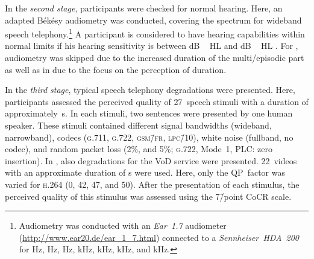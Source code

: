 In the \emph{second stage}, participants were checked for normal hearing.
Here, an adapted Békésy audiometry was conducted, covering the spectrum for wideband speech telephony.\footnote{Audiometry was conducted with an \emph{Ear~1.7} audiometer (\url{http://www.ear20.de/ear_1_7.html}) connected to a \emph{Sennheiser~HDA~200} for \unit[125]{Hz}, \unit[250]{Hz}, \unit[500]{Hz}, \unit[1]{kHz}, \unit[2]{kHz}, \unit[4]{kHz}, and \unit[8]{kHz}.}
A participant is considered to have hearing capabilities within normal limits if his hearing sensitivity is between \unit[0]{dB\,HL} and \unit[25]{dB\,HL} \citep[][p.\,256]{roeser_audiology_2007}.
For \EIIb{}, audiometry was skipped due to the increased duration of the multi\-/episodic part as well as in  due to the focus on the perception of duration.

In the \emph{third stage}, typical speech telephony degradations were presented.
Here, participants assessed the perceived quality of 27~speech stimuli with a duration of approximately~\unit[8]{s}.
In each stimuli, two sentences were presented by one human speaker.
These stimuli contained different signal bandwidths (wideband, narrowband), codecs (\textsc{\lowercase{G.711}}, \textsc{\lowercase{G.722}}, \textsc{\lowercase{GSM\=/FR}}, \textsc{\lowercase{LPC\=/10}}), white noise (fullband, no codec), and random packet loss (2\%, and 5\%; \textsc{\lowercase{G.722}}, Mode~1, \acs{PLC}: zero insertion).
In \EIIb{}, also degradations for the \ac{VoD} service were presented.
22~videos with an approximate duration of \unit[8]{s} were used.
Here, only the \acs{QP}~factor was varied for \textsc{\lowercase{H.264}} (0, 42, 47, and 50).
After the presentation of each stimulus, the perceived quality of this stimulus was assessed using the 7\=/point \ac{CoCR} scale.

